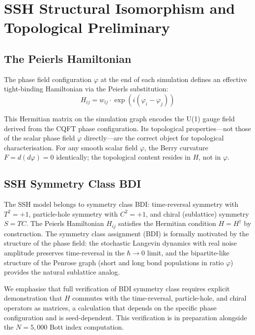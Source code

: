 \documentclass[11pt,a4paper]{article}
\begin{document}
\section{SSH Structural Isomorphism and Topological Preliminary}

\subsection{The Peierls Hamiltonian}

The phase field configuration $\varphi$ at the end of each simulation defines an effective tight-binding Hamiltonian via the Peierls substitution:
\begin{equation}
H_{ij} = w_{ij} \cdot \exp(i(\varphi_i - \varphi_j))
\end{equation}

This Hermitian matrix on the simulation graph encodes the U(1) gauge field derived from the CQFT phase configuration. Its topological properties---not those of the scalar phase field $\varphi$ directly---are the correct object for topological characterisation. For any smooth scalar field $\varphi$, the Berry curvature $F = d(d\varphi) = 0$ identically; the topological content resides in $H$, not in $\varphi$.

\subsection{SSH Symmetry Class BDI}

The SSH model belongs to symmetry class BDI: time-reversal symmetry with $T^2 = +1$, particle-hole symmetry with $C^2 = +1$, and chiral (sublattice) symmetry $S = TC$. The Peierls Hamiltonian $H_{ij}$ satisfies the Hermitian condition $H = H^\dagger$ by construction. The symmetry class assignment (BDI) is formally motivated by the structure of the phase field: the stochastic Langevin dynamics with real noise amplitude preserves time-reversal in the $\hbar \to 0$ limit, and the bipartite-like structure of the Penrose graph (short and long bond populations in ratio $\varphi$) provides the natural sublattice analog.

We emphasise that full verification of BDI symmetry class requires explicit demonstration that $H$ commutes with the time-reversal, particle-hole, and chiral operators as matrices, a calculation that depends on the specific phase configuration and is seed-dependent. This verification is in preparation alongside the $N = 5{,}000$ Bott index computation.
\end{document}
